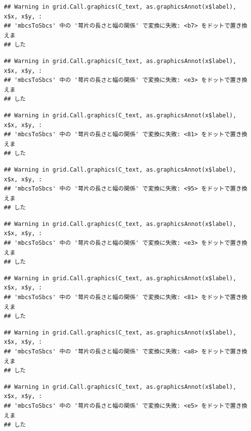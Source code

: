 \documentclass[
]{book}
\begin{document}
\begin{verbatim}
## Warning in grid.Call.graphics(C_text, as.graphicsAnnot(x$label), x$x, x$y, :
## 'mbcsToSbcs' 中の '萼片の長さと幅の関係' で変換に失敗: <b7> をドットで置き換えま
## した
\end{verbatim}

\begin{verbatim}
## Warning in grid.Call.graphics(C_text, as.graphicsAnnot(x$label), x$x, x$y, :
## 'mbcsToSbcs' 中の '萼片の長さと幅の関係' で変換に失敗: <e3> をドットで置き換えま
## した
\end{verbatim}

\begin{verbatim}
## Warning in grid.Call.graphics(C_text, as.graphicsAnnot(x$label), x$x, x$y, :
## 'mbcsToSbcs' 中の '萼片の長さと幅の関係' で変換に失敗: <81> をドットで置き換えま
## した
\end{verbatim}

\begin{verbatim}
## Warning in grid.Call.graphics(C_text, as.graphicsAnnot(x$label), x$x, x$y, :
## 'mbcsToSbcs' 中の '萼片の長さと幅の関係' で変換に失敗: <95> をドットで置き換えま
## した
\end{verbatim}

\begin{verbatim}
## Warning in grid.Call.graphics(C_text, as.graphicsAnnot(x$label), x$x, x$y, :
## 'mbcsToSbcs' 中の '萼片の長さと幅の関係' で変換に失敗: <e3> をドットで置き換えま
## した
\end{verbatim}

\begin{verbatim}
## Warning in grid.Call.graphics(C_text, as.graphicsAnnot(x$label), x$x, x$y, :
## 'mbcsToSbcs' 中の '萼片の長さと幅の関係' で変換に失敗: <81> をドットで置き換えま
## した
\end{verbatim}

\begin{verbatim}
## Warning in grid.Call.graphics(C_text, as.graphicsAnnot(x$label), x$x, x$y, :
## 'mbcsToSbcs' 中の '萼片の長さと幅の関係' で変換に失敗: <a8> をドットで置き換えま
## した
\end{verbatim}

\begin{verbatim}
## Warning in grid.Call.graphics(C_text, as.graphicsAnnot(x$label), x$x, x$y, :
## 'mbcsToSbcs' 中の '萼片の長さと幅の関係' で変換に失敗: <e5> をドットで置き換えま
## した
\end{verbatim}
\end{document}
